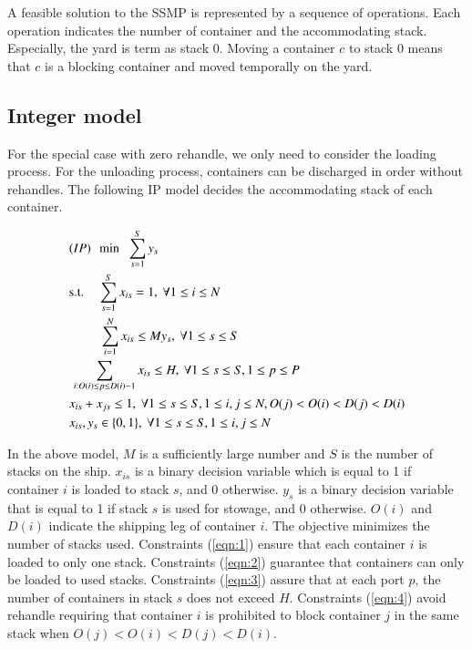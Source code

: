 \documentclass[review,3p,times,authoryear,12pt]{elsarticle}
\begin{document}
A feasible solution to the SSMP is represented by a sequence of operations. Each operation indicates the number of container and the accommodating stack. Especially, the yard is term as stack 0. Moving a container $c$ to stack 0 means that $c$ is a blocking container and moved temporally on the yard.

\subsection{Integer model}
For the special case with zero rehandle, we only need to consider the loading process. For the unloading process, containers can be discharged in order without rehandles. The following IP model decides the accommodating stack of each container.
\begin{small}
\begin{align}
& (IP)~~\min\hspace{6pt}\sum_{s=1}^{S} y_s\notag\\
& \mathrm{s.t.}\hspace{11pt}\sum_{s=1}^{S} x_{is}=1, ~\forall 1\le i \le N \label{eqn:1}\\
& \hspace{24pt}\sum_{i=1}^{N} x_{is}\le M y_s, ~\forall 1\le s \le S	\label{eqn:2}\\
& \hspace{2pt}\sum_{i:O(i)\le p\le D(i)-1} x_{is}\le H, ~\forall 1\le s\le S, 1\le p\le P		\label{eqn:3}\\
& x_{is}+x_{js}\le 1, ~\forall 1\le s\le S, 1\le i,j\le N, O(j)<O(i)<D(j)<D(i)	\label{eqn:4}\\
& x_{is}, y_s \in \{0,1\}, ~\forall 1\le s\le S,1\le i,j\le N
\end{align}
\end{small}

In the above model, $M$ is a sufficiently large number and $S$ is the number of stacks on the ship.
$x_{is}$ is a binary decision variable which is equal to 1 if container $i$ is loaded to stack $s$, and 0 otherwise.
$y_s$ is a binary decision variable that is equal to 1 if stack $s$ is used for stowage, and 0 otherwise.
$O(i)$ and $D(i)$ indicate the shipping leg of container $i$.
The objective minimizes the number of stacks used.
Constraints (\ref{eqn:1}) ensure that each container $i$ is loaded to only one stack.
Constraints (\ref{eqn:2}) guarantee that containers can only be loaded to used stacks.
Constraints (\ref{eqn:3}) assure that at each port $p$, the number of containers in stack $s$ does not exceed $H$.
Constraints (\ref{eqn:4}) avoid rehandle requiring that container $i$ is prohibited to block container $j$ in the same stack when $O(j)<O(i)<D(j)<D(i)$.
\end{document}
